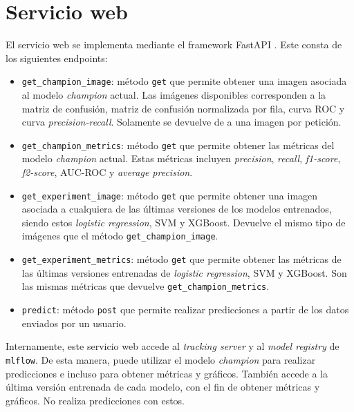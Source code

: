 \section{Servicio web}

El servicio web se implementa mediante el framework FastAPI \citep{WEBSITE:fastapi}. Este consta de los siguientes endpoints:

\begin{itemize}
    \item \texttt{get\_champion\_image}: método \texttt{get} que permite obtener una imagen asociada al modelo \textit{champion} actual. Las imágenes disponibles corresponden a la matriz de confusión, matriz de confusión normalizada por fila, curva ROC y curva \textit{precision-recall}. Solamente se devuelve de a una imagen por petición.
    \item \texttt{get\_champion\_metrics}: método \texttt{get} que permite obtener las métricas del modelo \textit{champion} actual. Estas métricas incluyen \textit{precision}, \textit{recall}, \textit{f1-score}, \textit{f2-score}, AUC-ROC y \textit{average precision}.
    \item \texttt{get\_experiment\_image}: método \texttt{get} que permite obtener una imagen asociada a cualquiera de las últimas versiones de los modelos entrenados, siendo estos \textit{logistic regression}, SVM y XGBoost. Devuelve el mismo tipo de imágenes que el método \texttt{get\_champion\_image}.
    \item \texttt{get\_experiment\_metrics}: método \texttt{get} que permite obtener las métricas de las últimas versiones entrenadas de \textit{logistic regression}, SVM y XGBoost. Son las mismas métricas que devuelve \texttt{get\_champion\_metrics}.
    \item \texttt{predict}: método \texttt{post} que permite realizar predicciones a partir de los datos enviados por un usuario.
\end{itemize}

Internamente, este servicio web accede al \textit{tracking server} y al \textit{model registry} de \texttt{mlflow}. De esta manera, puede utilizar el modelo \textit{champion} para realizar predicciones e incluso para obtener métricas y gráficos. También accede a la última versión entrenada de cada modelo, con el fin de obtener métricas y gráficos. No realiza predicciones con estos.

